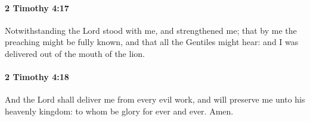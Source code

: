		\paragraph{2 Timothy 4:17} %
			\label{2TIMOTHY-4-17}

			Notwithstanding the Lord stood with me, and strengthened me; that by me the preaching might be fully known, and that all the Gentiles might hear: and I was delivered out of the mouth of the lion.

			\begin{framed}
			\scriptsize
				\begin{compactdesc}
					\item[SBLG] 
				\end{compactdesc}
			\end{framed}

		\paragraph{2 Timothy 4:18} %
			\label{2TIMOTHY-4-18}

			And the Lord shall deliver me from every evil work, and will preserve me unto his heavenly kingdom: to whom be glory for ever and ever.  Amen.

